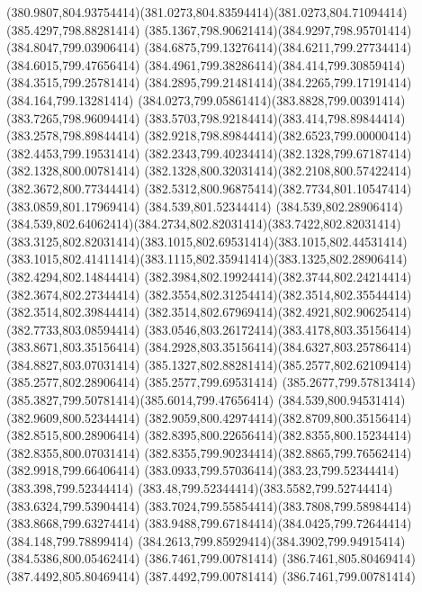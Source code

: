 {{	\curveto(380.9807,804.93754414)(381.0273,804.83594414)(381.0273,804.71094414)
	\closepath
	\moveto(385.4297,798.88281414)
	\curveto(385.1367,798.90621414)(384.9297,798.95701414)(384.8047,799.03906414)
	\curveto(384.6875,799.13276414)(384.6211,799.27734414)(384.6015,799.47656414)
	\curveto(384.4961,799.38286414)(384.414,799.30859414)(384.3515,799.25781414)
	\curveto(384.2895,799.21481414)(384.2265,799.17191414)(384.164,799.13281414)
	\curveto(384.0273,799.05861414)(383.8828,799.00391414)(383.7265,798.96094414)
	\curveto(383.5703,798.92184414)(383.414,798.89844414)(383.2578,798.89844414)
	\curveto(382.9218,798.89844414)(382.6523,799.00000414)(382.4453,799.19531414)
	\curveto(382.2343,799.40234414)(382.1328,799.67187414)(382.1328,800.00781414)
	\curveto(382.1328,800.32031414)(382.2108,800.57422414)(382.3672,800.77344414)
	\curveto(382.5312,800.96875414)(382.7734,801.10547414)(383.0859,801.17969414)
	\lineto(384.539,801.52344414)
	\lineto(384.539,802.28906414)
	\curveto(384.539,802.64062414)(384.2734,802.82031414)(383.7422,802.82031414)
	\curveto(383.3125,802.82031414)(383.1015,802.69531414)(383.1015,802.44531414)
	\curveto(383.1015,802.41411414)(383.1115,802.35941414)(383.1325,802.28906414)
	\lineto(382.4294,802.14844414)
	\curveto(382.3984,802.19924414)(382.3744,802.24214414)(382.3674,802.27344414)
	\curveto(382.3554,802.31254414)(382.3514,802.35544414)(382.3514,802.39844414)
	\curveto(382.3514,802.67969414)(382.4921,802.90625414)(382.7733,803.08594414)
	\curveto(383.0546,803.26172414)(383.4178,803.35156414)(383.8671,803.35156414)
	\curveto(384.2928,803.35156414)(384.6327,803.25786414)(384.8827,803.07031414)
	\curveto(385.1327,802.88281414)(385.2577,802.62109414)(385.2577,802.28906414)
	\lineto(385.2577,799.69531414)
	\curveto(385.2677,799.57813414)(385.3827,799.50781414)(385.6014,799.47656414)
	\closepath
	\moveto(384.539,800.94531414)
	\lineto(382.9609,800.52344414)
	\curveto(382.9059,800.42974414)(382.8709,800.35156414)(382.8515,800.28906414)
	\curveto(382.8395,800.22656414)(382.8355,800.15234414)(382.8355,800.07031414)
	\curveto(382.8355,799.90234414)(382.8865,799.76562414)(382.9918,799.66406414)
	\curveto(383.0933,799.57036414)(383.23,799.52344414)(383.398,799.52344414)
	\curveto(383.48,799.52344414)(383.5582,799.52744414)(383.6324,799.53904414)
	\curveto(383.7024,799.55854414)(383.7808,799.58984414)(383.8668,799.63274414)
	\curveto(383.9488,799.67184414)(384.0425,799.72644414)(384.148,799.78899414)
	\curveto(384.2613,799.85929414)(384.3902,799.94915414)(384.5386,800.05462414)
	\closepath
	\moveto(386.7461,799.00781414)
	\lineto(386.7461,805.80469414)
	\lineto(387.4492,805.80469414)
	\lineto(387.4492,799.00781414)
	\closepath
	\moveto(386.7461,799.00781414)
}
}


